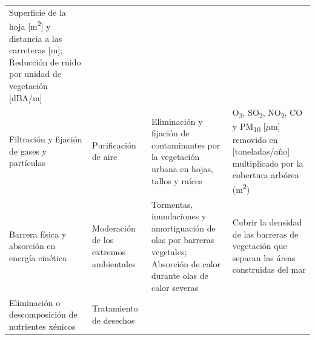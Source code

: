 \documentclass[12pt,a4paper,oneside, openany]{book}
\theoremstyle{definition}
\theoremstyle{definition}
\theoremstyle{definition}
\theoremstyle{remark}
\begin{document}
\begin{longtable}[]{@{}llll@{}}
\begin{minipage}[t]{0.22\columnwidth}
Superficie de la hoja {[}m\textsuperscript{2}{]} y distancia a las
carreteras {[}m{]}; Reducción de ruido por unidad de vegetación
{[}dBA/m{]}\strut
\end{minipage}\tabularnewline
\begin{minipage}[t]{0.26\columnwidth}\raggedright\strut
Filtración y fijación de gases y partículas\strut
\end{minipage} & \begin{minipage}[t]{0.22\columnwidth}\raggedright\strut
Purificación de aire\strut
\end{minipage} & \begin{minipage}[t]{0.19\columnwidth}\raggedright\strut
Eliminación y fijación de contaminantes por la vegetación urbana en
hojas, tallos y raíces\strut
\end{minipage} & \begin{minipage}[t]{0.22\columnwidth}\raggedright\strut
O\textsubscript{3}, SO\textsubscript{2}, NO\textsubscript{2}, CO y
PM\textsubscript{10} {[}\(\mu\)m{]} removido en {[}toneladas/año{]}
multiplicado por la cobertura arbórea (m\textsuperscript{2})\strut
\end{minipage}\tabularnewline
\begin{minipage}[t]{0.26\columnwidth}\raggedright\strut
Barrera física y absorción en energía cinética\strut
\end{minipage} & \begin{minipage}[t]{0.22\columnwidth}\raggedright\strut
Moderación de los extremos ambientales\strut
\end{minipage} & \begin{minipage}[t]{0.19\columnwidth}\raggedright\strut
Tormentas, inundaciones y amortiguación de olas por barreras vegetales;
Absorción de calor durante olas de calor severas\strut
\end{minipage} & \begin{minipage}[t]{0.22\columnwidth}\raggedright\strut
Cubrir la densidad de las barreras de vegetación que separan las áreas
construidas del mar\strut
\end{minipage}\tabularnewline
\begin{minipage}[t]{0.26\columnwidth}\raggedright\strut
Eliminación o descomposición de nutrientes xénicos\strut
\end{minipage} & \begin{minipage}[t]{0.22\columnwidth}\raggedright\strut
Tratamiento de desechos\strut
\end{minipage} & \begin{minipage}[t]{0.19\columnwidth}\raggedright\strut

\end{minipage}
\end{longtable}
\end{document}
